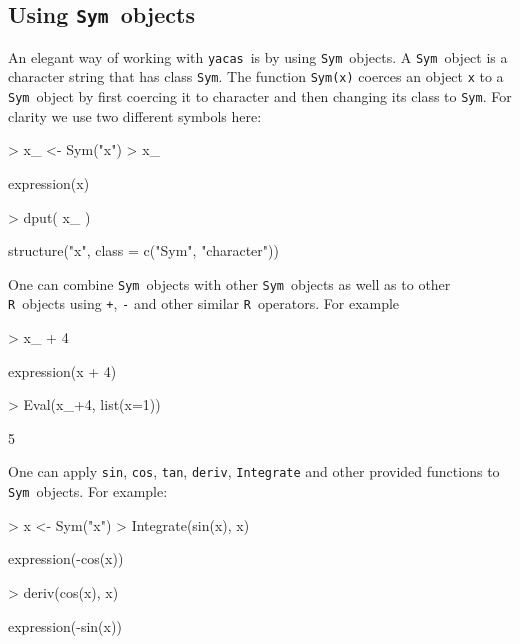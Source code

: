\documentclass[10pt]{article}
\newcommand{\yacas}{{\tt yacas}}
\newcommand{\code}[1]{{\tt #1}}
\def\R{\texttt{R}}
\def\sym{\texttt{Sym}}
\begin{document}
\subsection{Using \sym\ objects}


An elegant way of working with \yacas\ is by using \sym\ objects.  A
\sym\ object is a character string that has class \verb'Sym'.  The
function \code{Sym(x)} coerces an object \code{x} to a \sym\ object
by first coercing it to character and then changing its class to
\verb"Sym". For clarity we use two different symbols here:
\begin{Schunk}
\begin{Sinput}
> x_ <- Sym("x")
> x_
\end{Sinput}
\begin{Soutput}
expression(x)
\end{Soutput}
\begin{Sinput}
> dput( x_ )
\end{Sinput}
\begin{Soutput}
structure("x", class = c("Sym", "character"))
\end{Soutput}
\end{Schunk}

One can combine \sym\ objects with other \sym\ objects as well as to
other \R\ objects using \code{+}, \code{-} and other similar \R\
operators. For example
\begin{Schunk}
\begin{Sinput}
> x_ + 4
\end{Sinput}
\begin{Soutput}
expression(x + 4)
\end{Soutput}
\begin{Sinput}
> Eval(x_+4, list(x=1))
\end{Sinput}
\begin{Soutput}
[1] 5
\end{Soutput}
\end{Schunk}

One can apply \code{sin}, \code{cos}, \code{tan}, \code{deriv},
\code{Integrate} and other provided functions to \sym\ objects.
For example:
\begin{Schunk}
\begin{Sinput}
> x <- Sym("x")
> Integrate(sin(x), x)
\end{Sinput}
\begin{Soutput}
expression(-cos(x))
\end{Soutput}
\begin{Sinput}
> deriv(cos(x), x)
\end{Sinput}
\begin{Soutput}
expression(-sin(x))
\end{Soutput}
\end{Schunk}
\end{document}
